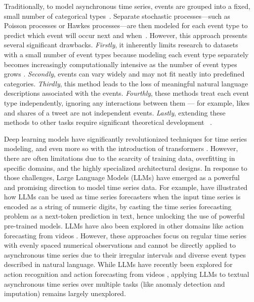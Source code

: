 Traditionally, to model asynchronous time series, events are grouped into a fixed, small number of categorical types~\citep{Xue2023EasyTPP}. Separate stochastic processes—such as Poisson processes or Hawkes processes—are then modeled for each event type to predict which event will occur next and when~\citep{Mei2022Transformer,Hawkes1971Spectra}. However, this approach presents several significant drawbacks. \textit{Firstly}, it inherently limits research to datasets with a small number of event types because modeling each event type separately becomes increasingly computationally intensive as the number of event types grows \citep{Zuo2020Transformer}. \textit{Secondly}, events can vary widely and may not fit neatly into predefined categories. \textit{Thirdly}, this method leads to the loss of meaningful natural language descriptions associated with the events. \textit{Fourthly}, these methods treat each event type independently, ignoring any interactions between them --- for example, likes and shares of a tweet are not independent events. \textit{Lastly}, extending these methods to other tasks require significant theoretical development~ \citep{shchur2021detecting}. %

Deep learning models have significantly revolutionized techniques for time series modeling, and even more so with the introduction of transformers \citep{Vaswani2017Attention}. However, there are often limitations due to the scarcity of training data, overfitting in specific domains, and the highly specialized architectural designs. In response to those challenges, Large Language Models (LLMs) have emerged as a powerful and promising direction to model time series data. For example,  \citet{Gruver2023Large, Zhou2023One, Xue2023Promptcast, Jin2023TimeLLM} have illustrated how LLMs can be used as time series forecasters when the input time series is encoded as a string of numeric digits, by  casting the time series forecasting problem as a next-token prediction in text, hence unlocking the use of powerful pre-trained models. LLMs have also been explored in other domains like action forecasting from videos \citep{zhaoantgpt, wang2024lifelongmemory}. {However, these approaches focus on regular time series with evenly spaced numerical observations and cannot be directly applied to asynchronous time series due to their irregular intervals and diverse event types described in natural language. While LLMs have recently been explored for action recognition and action forecasting from videos \citep{zhaoantgpt,wang2024lifelongmemory}, applying LLMs to textual asynchronous time series over multiple tasks (like anomaly detection and imputation) remains largely unexplored. }


